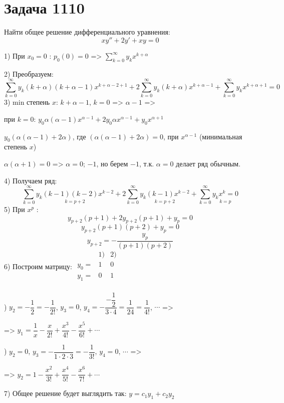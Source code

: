 \section*{Задача 1110}
Найти общее решение дифференциального уравнения:
$$ xy'' + 2y' + xy = 0 $$
\begin{solution}
    1) При $x_0 = 0 $ : $ p_0(0) = 0 $ => $ \sum_{k = 0}^{\infty} y_k x^{k + \alpha} $ \par
    2) Преобразуем: $$ \sum_{k = 0}^{\infty} y_k (k + \alpha) (k + \alpha - 1) x^{k + \alpha - 2 + 1} + 2 \sum_{k = 0}^{\infty} y_k (k + \alpha) x^{k + \alpha - 1} + \sum_{k = 0}^{\infty} y_k x^{k + \alpha + 1} = 0 $$
    3) min степень $x$: $ k + \alpha - 1 $, $ k = 0 $ => $ \alpha - 1 $ => \par
    при $ k = 0 $: $ y_0 \alpha (\alpha - 1) x^{\alpha - 1} + 2 y_0 \alpha x^{\alpha - 1} + y_0 x^{\alpha + 1} $ \par
    $ y_0 (\alpha (\alpha - 1) + 2 \alpha) $, где $ (\alpha (\alpha - 1) + 2 \alpha) = 0 $, при $ x^{\alpha - 1} $ (минимальная степень $x$) \par
    $ \alpha (\alpha + 1) = 0 $ => $ \alpha = 0 $; $-1$, но берем $-1$, т.к. $\alpha = 0$ делает ряд обычным. \par
    4) Получаем ряд: $$ \sum_{k = 0}^{\infty} \underset{k = p + 2}{y_k (k - 1) (k - 2) x^{k - 2}} + 2 \sum_{k = 0}^{\infty} \underset{k = p + 2}{y_k (k - 1) x^{k - 2}} + \sum_{k = 0}^{\infty} \underset{k = p}{y_k x^k = 0} $$
    5) При $ x^p $ : $$ y_{p + 2} (p + 1) + 2y_{p + 2} (p + 1) + y_p = 0 $$
    $$ y_{p + 2} (p + 1) (p + 2) + y_p = 0 $$
    $$ y_{p + 2} = -\dfrac{y_p}{(p + 1) (p + 2)} $$
    6) Построим матрицу: 
    $
        \begin{array}{ccc}
                  & 1) & 2) \\
            y_0 = & 1  & 0  \\
            y_1 = & 0  & 1  \\
        \end{array}
    $ \par
    ) $ y_2 = -\dfrac{1}{2} = -\dfrac{1}{2!} $, $ y_3 = 0 $, $ y_4 = -\dfrac{-\dfrac{1}{2}}{3 \cdot 4} = \dfrac{1}{24} = \dfrac{1}{4!} $, $\cdots$ => \par
    => $ y_1 = \dfrac{1}{x} - \dfrac{x}{2!} + \dfrac{x^3}{4!} - \dfrac{x^5}{6!} + \cdots $\par
    ) $ y_2 = 0 $, $ y_3 = -\dfrac{1}{1 \cdot 2 \cdot 3} = -\dfrac{1}{3!} $, $ y_4 = 0 $, $\cdots$ => \par
    => $ y_2 = 1 - \dfrac{x^2}{3!} + \dfrac{x^4}{5!} - \dfrac{x^6}{7!} + \cdots $ \par
    7) Общее решение будет выглядить так: $ y = c_1y_1 + c_2y_2 $
\end{solution}\pagebreak
